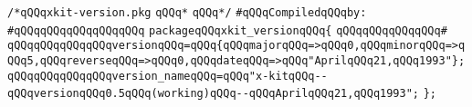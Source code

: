 \label{src/lib/x-kit/xclient/src/stuff/xkit-version.pkg}
\verb|/*qQQqxkit-version.pkg|\newline
\verb|qQQq*|\newline
\verb|qQQq*/|\newline
\newline
\verb|#qQQqCompiledqQQqby:|\newline
\verb|#qQQqqQQqqQQqqQQqqQQq|\newline
\newline
\verb|packageqQQqxkit_versionqQQq{|\newline
\verb|qQQqqQQqqQQqqQQq#|\newline
\verb|qQQqqQQqqQQqqQQqversionqQQq=qQQq{qQQqmajorqQQq=>qQQq0,qQQqminorqQQq=>qQQq5,qQQqreverseqQQq=>qQQq0,qQQqdateqQQq=>qQQq"AprilqQQq21,qQQq1993"};|\newline
\verb|qQQqqQQqqQQqqQQqversion_nameqQQq=qQQq"x-kitqQQq--qQQqversionqQQq0.5qQQq(working)qQQq--qQQqAprilqQQq21,qQQq1993";|\newline
\newline
\verb|};|\newline
\newline

